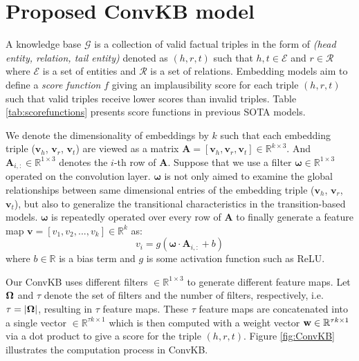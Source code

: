 \documentclass[11pt,a4paper]{article}
\begin{document}
\section{Proposed ConvKB model}
\label{sec:model}

A knowledge base $\mathcal{G}$ is a collection of valid factual triples in the form of \textit{(head entity, relation, tail entity)} denoted as $(h, r, t)$ such that $h, t \in \mathcal{E}$ and $r \in \mathcal{R}$ where $\mathcal{E}$ is a set of entities and $\mathcal{R}$ is a set of relations.
Embedding models aim to define a \textit{score function} $f$ giving an implausibility score for each triple $(h, r, t)$ such that valid  triples receive lower scores than invalid triples.
Table \ref{tab:scorefunctions} presents score functions in previous SOTA models.



We denote the dimensionality of embeddings by $k$ such that each embedding triple ($\boldsymbol{v}_h$, $\boldsymbol{v}_r$, $\boldsymbol{v}_t$) are viewed as a matrix $\boldsymbol{A} = [\boldsymbol{v}_h,\boldsymbol{v}_r,\boldsymbol{v}_t] \in \mathbb{R}^{k\times3}$. 
And $\boldsymbol{A}_{i,:} \in \mathbb{R}^{1\times3}$ denotes the $i$-th row of $\boldsymbol{A}$. 
Suppose that we use a filter $\boldsymbol{\omega} \in \mathbb{R}^{1\times3}$ operated on the convolution layer.
$\boldsymbol{\omega}$ is not only aimed  to examine the global relationships between same dimensional entries of the embedding triple ($\boldsymbol{v}_h$, $\boldsymbol{v}_r$, $\boldsymbol{v}_t$), but also to generalize the transitional characteristics in the transition-based models.
$\boldsymbol{\omega}$ is repeatedly operated over every row of $\boldsymbol{A}$ to finally generate a feature map $\boldsymbol{v} = [v_1, v_2, ..., v_k] \in \mathbb{R}^{k}$ as:
\begin{equation}
v_i = g\left(\boldsymbol{\omega} \cdot{\boldsymbol{A}_{i,:}} + b\right) \nonumber
\end{equation}
where $b \in \mathbb{R}$ is a bias term and $g$ is some   activation function such as  ReLU. 

Our ConvKB uses different filters $\in \mathbb{R}^{1\times3}$ to generate different feature maps. 
Let $\bold{\Omega}$ and $\tau$ denote the set of filters and the number of filters, respectively, i.e. $\tau = |\bold{\Omega}|$, resulting in  $\tau$ feature maps. 
These $\tau$ feature maps are concatenated into a single vector $\in \mathbb{R}^{\tau k\times1}$ which is then computed with a weight vector $\bold{w} \in \mathbb{R}^{\tau k\times1}$ via a dot product to give a score for the triple $(h, r, t)$. Figure \ref{fig:ConvKB} illustrates the computation process  in  ConvKB.
\end{document}
